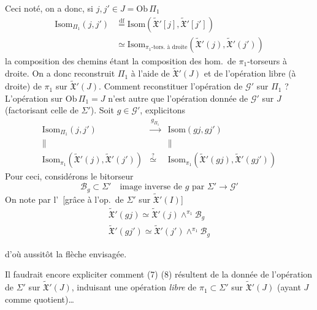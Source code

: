 \documentclass[11pt,a4paper]{article}
\begin{document}
Ceci noté, on a donc, si $j, j' \in J = \mathrm{Ob}\,\Pi_1$
\[
  \begin{aligned}
    \mathrm{Isom}_{\Pi_1}(j, j') &\overset{\mathrm{df}}{=}
      \mathrm{Isom}(\widetilde{\mathfrak{X}}'[j], \widetilde{\mathfrak{X}}'[j']) \\
    &\simeq \mathrm{Isom}_{\pi_1\text{-tors.\ à droite}}
      (\widetilde{\mathfrak{X}}'(j), \widetilde{\mathfrak{X}}'(j'))
  \end{aligned}
\]
la composition des chemins étant la composition des hom.\ de
$\pi_1$-torseurs à droite. \struck{\ill{}} On a donc reconstruit
 $\Pi_1$ à l'aide de
$\widetilde{\mathfrak{X}}'(J)$ et de l'opération libre (à droite) de $\pi_1$ sur
$\widetilde{\mathfrak{X}}'(J)$. \struck{[Les opérations} Comment reconstituer
l'opération de $\mathcal{G}'$ sur $\Pi_1$ ? L'opération sur
$\mathrm{Ob}\,\Pi_1 = J$ n'est autre que l'opération donnée de $\mathcal{G}'$
sur $J$ (factorisant celle de $\Sigma'$). Soit $g \in \mathcal{G}'$,
explicitons
\[
  \begin{array}{ccc}
    \mathrm{Isom}_{\Pi_1}(j, j') & \xrightarrow{\ g_{\Pi_1}\ } &
      \mathrm{Isom}(gj, gj') \\
    \| & & \| \\
    \mathrm{Isom}_{\pi_1}(\widetilde{\mathfrak{X}}'(j), \widetilde{\mathfrak{X}}'(j'))
      & \overset{?}{\simeq} &
      \mathrm{Isom}_{\pi_1}(\widetilde{\mathfrak{X}}'(gj), \widetilde{\mathfrak{X}}'(gj'))
  \end{array}
\]
Pour ceci, considérons le  bitorseur
\[
  \mathcal{B}_g \subset \Sigma'\quad \text{image inverse de } g \text{ par }
  \Sigma' \to \mathcal{G}'
\]
On note par l'\ [grâce à l'op.\ de $\Sigma'$ sur
$\widetilde{\mathfrak{X}}'(I)$]
\[
  \begin{array}{l}
    \widetilde{\mathfrak{X}}'(gj) \simeq \widetilde{\mathfrak{X}}'(j) \wedge^{\pi_1} \mathcal{B}_g \\
    \widetilde{\mathfrak{X}}'(gj') \simeq \widetilde{\mathfrak{X}}'(j') \wedge^{\pi_1} \mathcal{B}_g
  \end{array}
\]

d'où aussitôt la flèche envisagée.

Il faudrait encore expliciter comment (7) (8) résultent de la donnée de
l'opération de $\Sigma'$ sur $\widetilde{\mathfrak{X}}'(J)$, induisant une
opération \emph{libre} de $\pi_1 \subset \Sigma'$ sur
$\widetilde{\mathfrak{X}}'(J)$ (ayant $J$ comme quotient)…
\end{document}
